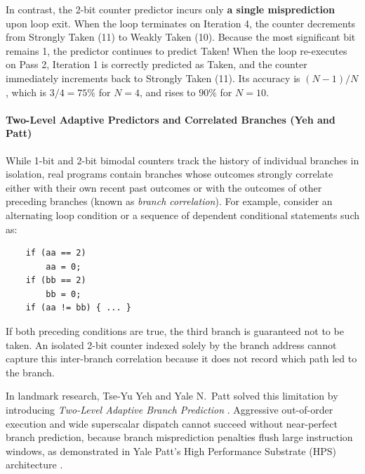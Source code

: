 In contrast, the 2-bit counter predictor incurs only \textbf{a single misprediction} upon loop exit. When the loop terminates on Iteration 4, the counter decrements from Strongly Taken (11) to Weakly Taken (10). Because the most significant bit remains 1, the predictor continues to predict Taken! When the loop re-executes on Pass 2, Iteration 1 is correctly predicted as Taken, and the counter immediately increments back to Strongly Taken (11). Its accuracy is $(N-1)/N$, which is $3/4 = 75\%$ for $N = 4$, and rises to $90\%$ for $N = 10$.

\paragraph{Two-Level Adaptive Predictors and Correlated Branches (Yeh and Patt)}
\label{sec:yeh_patt}

While 1-bit and 2-bit bimodal counters track the history of individual branches in isolation, real programs contain branches whose outcomes strongly correlate either with their own recent past outcomes or with the outcomes of other preceding branches (known as \emph{branch correlation}). For example, consider an alternating loop condition or a sequence of dependent conditional statements such as:
\begin{verbatim}
    if (aa == 2)
        aa = 0;
    if (bb == 2)
        bb = 0;
    if (aa != bb) { ... }
\end{verbatim}
If both preceding conditions are true, the third branch is guaranteed not to be taken. An isolated 2-bit counter indexed solely by the branch address cannot capture this inter-branch correlation because it does not record which path led to the branch.

In landmark research, Tse-Yu Yeh and Yale N.~Patt solved this limitation by introducing \textit{Two-Level Adaptive Branch Prediction} \cite{yeh1991twolevel, yeh1992alternative}. Aggressive out-of-order execution and wide superscalar dispatch cannot succeed without near-perfect branch prediction, because branch misprediction penalties flush large instruction windows, as demonstrated in Yale Patt's High Performance Substrate (HPS) architecture \cite{patt1985hps}.

